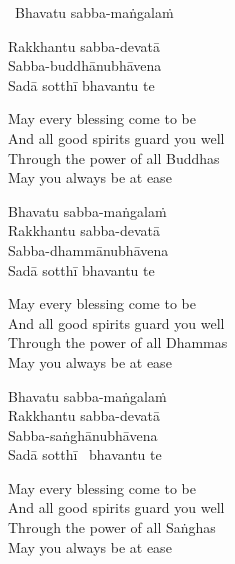 \begin{leader-only}
  \anglebracketleft\ \hspace{-0.5mm}Bhavatu sabba-maṅgalaṁ \hspace{-0.5mm}\anglebracketright\
\end{leader-only}

\vspace{-0.99em}

\begin{pali-hang}
  Rakkhantu sabba-devatā\\
  Sabba-buddhānubhāvena\\
  Sadā sotthī bhavantu te
\end{pali-hang}

\begin{english-verses}
  May every blessing come to be\\
  And all good spirits guard you well\\
  Through the power of all Buddhas\\
  May you always be at ease
\end{english-verses}

\begin{pali-hang-continued}
  Bhavatu sabba-maṅgalaṁ\\
  Rakkhantu sabba-devatā\\
  Sabba-dhammānubhāvena\\
  Sadā sotthī bhavantu te
\end{pali-hang-continued}

\begin{english-verses}
  May every blessing come to be\\
  And all good spirits guard you well\\
  Through the power of all Dhammas\\
  May you always be at ease
\end{english-verses}

\begin{pali-hang-continued}
  Bhavatu sabba-maṅgalaṁ\\
  Rakkhantu sabba-devatā\\
  Sabba-saṅghānubhāvena\\
  Sadā sotthī \breathmark\ bhavantu te
\end{pali-hang-continued}

\begin{english-verses}
  May every blessing come to be\\
  And all good spirits guard you well\\
  Through the power of all Saṅghas\\
  May you always be at ease
\end{english-verses}

\suttaRef{[Trad]}

